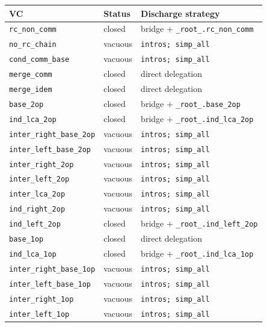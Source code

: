 \documentclass[11pt,a4paper]{article}
\theoremstyle{definition}
\theoremstyle{remark}
\begin{document}
\begin{table}[t]
  \centering
  \small
  \begin{tabular}{@{}llp{6cm}@{}}
    \toprule
    VC & Status & Discharge strategy \\
    \midrule
    \texttt{rc\_non\_comm}         & closed & bridge + \texttt{\_root\_.rc\_non\_comm} \\
    \texttt{no\_rc\_chain}         & vacuous & \texttt{intros; simp\_all} \\
    \texttt{cond\_comm\_base}      & vacuous & \texttt{intros; simp\_all} \\
    \texttt{merge\_comm}           & closed & direct delegation \\
    \texttt{merge\_idem}           & closed & direct delegation \\
    \texttt{base\_2op}             & closed & bridge + \texttt{\_root\_.base\_2op} \\
    \texttt{ind\_lca\_2op}         & closed & bridge + \texttt{\_root\_.ind\_lca\_2op} \\
    \texttt{inter\_right\_base\_2op} & vacuous & \texttt{intros; simp\_all} \\
    \texttt{inter\_left\_base\_2op}  & vacuous & \texttt{intros; simp\_all} \\
    \texttt{inter\_right\_2op}       & vacuous & \texttt{intros; simp\_all} \\
    \texttt{inter\_left\_2op}        & vacuous & \texttt{intros; simp\_all} \\
    \texttt{inter\_lca\_2op}         & vacuous & \texttt{intros; simp\_all} \\
    \texttt{ind\_right\_2op}         & vacuous & \texttt{intros; simp\_all} \\
    \texttt{ind\_left\_2op}          & closed & bridge + \texttt{\_root\_.ind\_left\_2op} \\
    \texttt{base\_1op}               & closed & direct delegation \\
    \texttt{ind\_lca\_1op}           & closed & bridge + \texttt{\_root\_.ind\_lca\_1op} \\
    \texttt{inter\_right\_base\_1op} & vacuous & \texttt{intros; simp\_all} \\
    \texttt{inter\_left\_base\_1op}  & vacuous & \texttt{intros; simp\_all} \\
    \texttt{inter\_right\_1op}       & vacuous & \texttt{intros; simp\_all} \\
    \texttt{inter\_left\_1op}        & vacuous & \texttt{intros; simp\_all} \\

\end{tabular}
\end{table}
\end{document}
